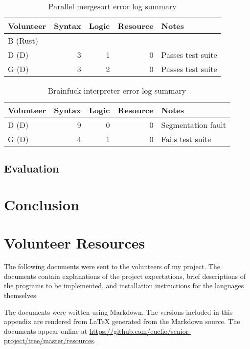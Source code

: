 \documentclass[finalcopy]{srpaper}
\begin{document}
\begin{table}[h]
\centering
\begin{tabular}{lrrrp{5cm}}
\toprule
Volunteer & Syntax & Logic & Resource & Notes \\
\midrule
B (Rust) & & & & \\
D (D) & 3 & 1 & 0 & Passes test suite \\
G (D) & 3 & 2 & 0 & Passes test suite \\
\bottomrule
\end{tabular}
\caption{Parallel mergesort error log summary}
\label{tab:parallelmergesort}
\end{table}

\begin{table}[h]
\centering
\begin{tabular}{lrrrp{5cm}}
\toprule
Volunteer & Syntax & Logic & Resource & Notes \\
\midrule
D (D) & 9 & 0 & 0 & Segmentation fault \\
G (D) & 4 & 1 & 0 & Fails test suite \\
\bottomrule
\end{tabular}
\caption{Brainfuck interpreter error log summary}
\label{tab:brainfuckinterpreter}
\end{table}

\section{Evaluation}

\chapter{Conclusion}

\nocite{*}


\appendix
\chapter{Volunteer Resources}\label{app:resources}
The following documents were sent to the volunteers of my project. The
documents contain explanations of the project expectations, brief descriptions
of the programs to be implemented, and installation instructions for the
languages themselves.

The documents were written using Markdown. The versions included in this
appendix are rendered from \LaTeX{} generated from the Markdown source. The
documents appear online at
\url{https://github.com/euclio/senior-project/tree/master/resources}.
\end{document}
